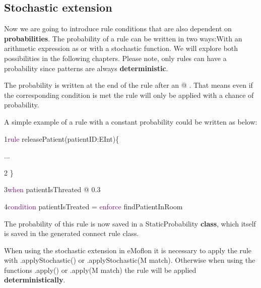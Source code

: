 \clearpage

\subsection{Stochastic extension}

Now we are going to introduce rule conditions that are also dependent on \textbf{probabilities}.
The probability of a rule can be written in two ways:\newline With an arithmetic expression as or with a stochastic function. We will explore both possibilities in the following chapters.\newline
Please note, only rules can have a probability since patterns are always \textbf{deterministic}.

The probability is written at the end of the rule after an \textsf{@} . That means even if the corresponding condition is met the rule will only be applied with a chance of \textsf{probability}.
\newline

A simple example of a rule with a constant probability could be written as below:\newline

{

1\hspace{0.5cm}\textcolor{Purple}{rule} releasePatient(patientID:EInt)\{

\hspace{0.75cm}...

2\hspace{0.5cm} \}

3\hspace{0.5cm}\textcolor{Purple}{when} patientIsThreated @ 0.3 

4\hspace{0.5cm}\textcolor{Purple}{condition} patientIsTreated = \textcolor{Purple}{enforce}  findPatientInRoom \newline
}

The probability of this rule is now saved in a \textsf{StaticProbability} \textbf{class}, which itself is saved in the generated connect rule class.\newline

When using the stochastic extension in eMoflon it is necessary to apply the rule with \textsf{.applyStochastic()} or \textsf{.applyStochastic(M match)}. Otherwise when using the functions \textsf{.apply()} or \textsf{.apply(M match)} the rule will be applied \textbf{deterministically}.

